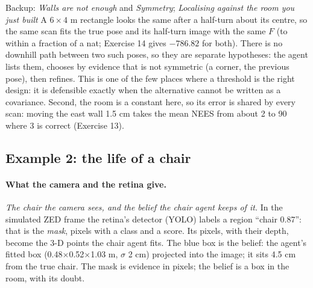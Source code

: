 \documentclass[11pt]{article}
\newcommand{\slt}[1]{\emph{#1}}   %
\begin{document}
\begin{backupbox}{Backup: \emph{Walls are not enough} and \emph{Symmetry}; \emph{Localising against the room you just built}}
A $6\times4$ m rectangle looks the same after a half-turn about its centre, so the same scan fits the true pose and its half-turn image with the same $F$ (to within a fraction of a nat; Exercise 14 gives $-786.82$ for both). There is no downhill path between two such poses, so they are separate hypotheses: the agent lists them, chooses by evidence that is not symmetric (a corner, the previous pose), then refines. This is one of the few places where a threshold is the right design: it is defensible exactly when the alternative cannot be written as a covariance. Second, the room is a constant here, so its error is shared by every scan: moving the east wall 1.5 cm takes the mean NEES from about 2 to 90 where 3 is correct (Exercise 13).
\end{backupbox}

\subsection{Example 2: the life of a chair}

\paragraph{What the camera and the retina give.} \slt{The chair the camera sees, and the belief the chair agent keeps of it.} In the simulated ZED frame the retina's detector (YOLO) labels a region ``chair 0.87'': that is the \emph{mask}, pixels with a class and a score. Its pixels, with their depth, become the 3-D points the chair agent fits. The blue box is the belief: the agent's fitted box (0.48$\times$0.52$\times$1.03 m, $\sigma$ 2 cm) projected into the image; it sits 4.5 cm from the true chair. The mask is evidence in pixels; the belief is a box in the room, with its doubt.
\end{document}
